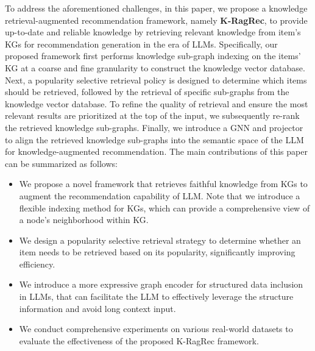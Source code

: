 To address the aforementioned challenges, in this paper, we propose a knowledge retrieval-augmented recommendation framework, namely \textbf{K-RagRec}, to provide up-to-date and reliable knowledge by retrieving relevant knowledge from item's KGs for recommendation generation in the era of LLMs. 
Specifically, our proposed framework first performs knowledge sub-graph indexing on the items' KG at a coarse and fine granularity to construct the knowledge vector database. 
Next, a popularity selective retrieval policy is designed to determine which items should be retrieved, followed by the retrieval of specific sub-graphs from the knowledge vector database. 
To refine the quality of retrieval and ensure the most relevant results are prioritized at the top of the input, we subsequently re-rank the retrieved knowledge sub-graphs. 
Finally, we introduce a GNN and projector to align the retrieved knowledge sub-graphs into the semantic space of the LLM for knowledge-augmented recommendation.
The main contributions of this paper can be summarized as follows:
\vspace{-0.1in}
 \begin{itemize} [leftmargin=*] 
\setlength{\itemsep}{0pt}
\setlength{\parsep}{0pt}
\setlength{\parskip}{0pt}
     \item We propose a novel framework that retrieves faithful knowledge from KGs to augment the recommendation capability of LLM. 
     Note that we introduce a flexible indexing method for KGs, which can provide a comprehensive view of a node’s neighborhood within KG.
     \item We design a popularity selective retrieval strategy to determine whether an item needs to be retrieved based on its popularity, significantly improving efficiency.
     \item We introduce a more expressive graph encoder for structured data inclusion in LLMs, that can facilitate the LLM to effectively leverage the structure information and avoid long context input.
     \item We conduct comprehensive experiments on various real-world datasets to evaluate the effectiveness of the proposed K-RagRec framework.
\end{itemize}
